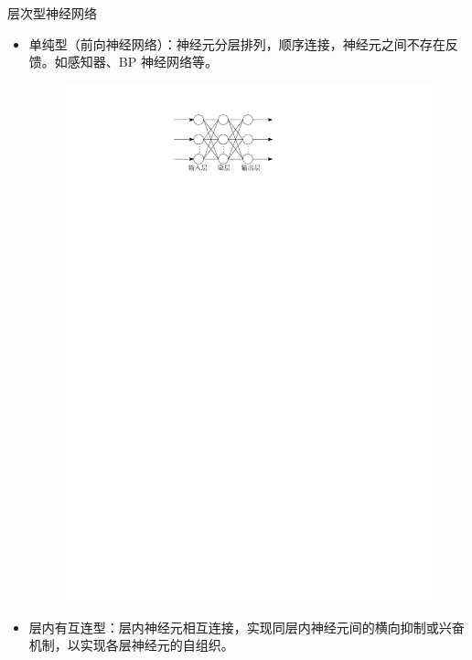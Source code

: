 \begin{note}
    层次型神经网络
    \begin{itemize}
        \item 单纯型（前向神经网络）：神经元分层排列，顺序连接，神经元之间不存在反馈。如感知器、BP 神经网络等。
        \begin{figure}[htbp]
            \centering
            \includegraphics{image/单纯型.pdf}
        \end{figure}
        \item 层内有互连型：层内神经元相互连接，实现同层内神经元间的横向抑制或兴奋机制，以实现各层神经元的自组织。
        \begin{figure}[htbp]
            \centering

\end{figure}
\end{itemize}
\end{note}
